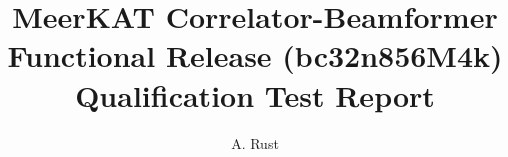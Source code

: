 \documentclass[11pt,english,twoside]{article}
\author{A. Rust}
\begin{document}
\title{MeerKAT Correlator-Beamformer Functional Release  (bc32n856M4k) Qualification Test Report}
\makekatdocbeginning
\end{document}

